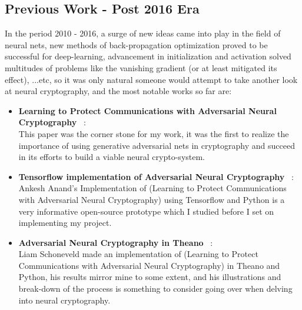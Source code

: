 \documentclass[a4paper, 12pt]{report}
\begin{document}
\subsection{\textbf{Previous Work - Post 2016 Era}}
In the period 2010 - 2016, a surge of new ideas came into play in the field of neural nets, new methods of back-propagation optimization proved to be successful for deep-learning, advancement in initialization and activation solved multitudes of problems like the vanishing gradient (or at least mitigated its effect), ...etc, so it was only natural someone would attempt to take another look at neural cryptography, and the most notable works so far are:
\begin{itemize}[nosep]
	\item \textbf{Learning to Protect Communications with Adversarial Neural Cryptography} ~\citep{DBLP:journals/corr/AbadiA16}:\\
	This paper was the corner stone for my work, it was the first to realize the importance of using generative adversarial nets in cryptography and succeed in its efforts to build a viable neural crypto-system.
	\item \textbf{Tensorflow implementation of Adversarial Neural Cryptography} ~\citep{ankeshanand/neural-cryptography-tensorflow}:\\
	Ankesh Anand's Implementation of (Learning to Protect Communications with Adversarial Neural Cryptography) using Tensorflow and Python is a very informative open-source prototype which I studied before I set on implementing my project.
	\item \textbf{Adversarial Neural Cryptography in Theano} ~\citep{nlml/adversarial-neural-cryptography}:\\
	Liam Schoneveld made an implementation of (Learning to Protect Communications with Adversarial Neural Cryptography) in Theano and Python, his results mirror mine to some extent, and his illustrations and break-down of the process is something to consider going over when delving into neural cryptography.
\end{itemize}
\newpage
\end{document}
